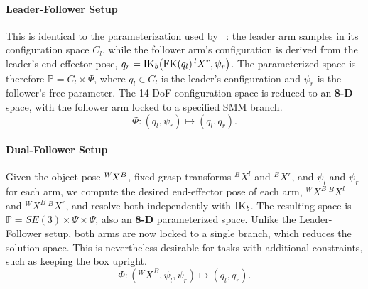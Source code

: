 \documentclass[letterpaper, 10 pt, conference]{ieeeconf}
\begin{document}
\paragraph{Leader-Follower Setup}
This is identical to the parameterization used by ~\cite{cohn2024constrained}: the leader arm samples in its configuration space $C_l$, while the follower arm's configuration is derived from the leader's end-effector pose, $q_r = \IK_b\!\left(\FK(q_l)\,{}^{l}X^{r}, \psi_r\right)$.
The parameterized space is therefore $\mathbb{P} = C_l \times \Psi$, where $q_l \in C_l$ is the leader's configuration and $\psi_r$ is the follower's free parameter. The 14-DoF configuration space is reduced to an \textbf{8-D} space, with the follower arm locked to a specified SMM branch. 
\[
    \Phi : (q_l, \psi_r) \mapsto (q_l, q_r).
\]

\paragraph{Dual-Follower Setup}
Given the object pose $\monogram{X}{W}{B}$, fixed grasp transforms ${}^{B}X^{l}$ and ${}^{B}X^{r}$, and $\psi_l$ and $\psi_r$ for each arm, we compute the desired end-effector pose of each arm, ${}^{W}X^{B}\,{}^{B}X^{l}$ and ${}^{W}X^{B}\,{}^{B}X^{r}$, and resolve both independently with $\IK_b$. The resulting space is $\mathbb{P} = SE(3) \times \Psi \times \Psi$, also an \textbf{8-D} parameterized space. Unlike the Leader-Follower setup, both arms are now locked to a single branch, which reduces the solution space. This is nevertheless desirable for tasks with additional constraints, such as keeping the box upright.
\[
    \Phi : ({}^{W}X^{B}, \psi_l, \psi_r) \mapsto (q_l, q_r).
\]

%     

%     
\end{document}
